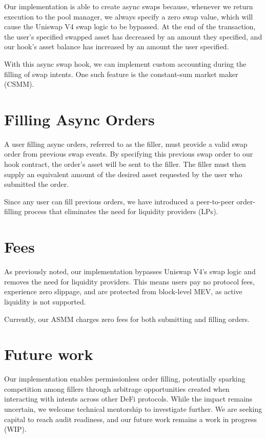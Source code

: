 \documentclass[bibliography=numbered]{article}
\begin{document}
Our implementation is able to create async swaps because, whenever we return execution to the pool manager, we always specify a zero swap value, which will cause the Uniswap V4 swap logic to be bypassed. At the end of the transaction, the user's specified swapped asset has decreased by an amount they specified, and our hook's asset balance has increased by an amount the user specified.

With this async swap hook, we can implement custom accounting during the filling of swap intents. One such feature is the constant-sum market maker (CSMM).

\section{Filling Async Orders}

A user filling async orders, referred to as the filler, must provide a valid swap order from previous swap events. By specifying this previous swap order to our hook contract, the order's asset will be sent to the filler. The filler must then supply an equivalent amount of the desired asset requested by the user who submitted the order.

Since any user can fill previous orders, we have introduced a peer-to-peer order-filling process that eliminates the need for liquidity providers (LPs).

\section{Fees}

As previously noted, our implementation bypasses Uniswap V4’s swap logic and removes the need for liquidity providers. This means users pay no protocol fees, experience zero slippage, and are protected from block-level MEV, as active liquidity is not supported.

Currently, our ASMM charges zero fees for both submitting and filling orders.

\section{Future work}

Our implementation enables permissionless order filling, potentially sparking competition among fillers through arbitrage opportunities created when interacting with intents across other DeFi protocols. While the impact remains uncertain, we welcome technical mentorship to investigate further. We are seeking capital to reach audit readiness, and our future work remains a work in progress (WIP).

\printbibliography %
\end{document}
